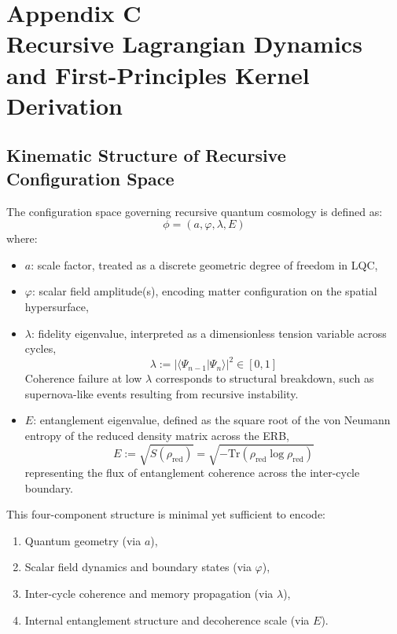 \section*{Appendix C\\Recursive Lagrangian Dynamics and First-Principles Kernel Derivation}
\label{appendix:C}

\subsection*{Kinematic Structure of Recursive Configuration Space}

The configuration space governing recursive quantum cosmology is defined as:
\[
\phi = (a, \varphi, \lambda, E)
\]
where:
\begin{itemize}
  \item \( a \): scale factor, treated as a discrete geometric degree of freedom in LQC,
  \item \( \varphi \): scalar field amplitude(s), encoding matter configuration on the spatial hypersurface,
  \item \( \lambda \): fidelity eigenvalue, interpreted as a dimensionless tension variable across cycles,
  \[
  \lambda := |\langle \Psi_{n-1} | \Psi_n \rangle|^2 \in [0,1]
  \]
  Coherence failure at low \( \lambda \) corresponds to structural breakdown, such as supernova-like events resulting from recursive instability.
  \item \( E \): entanglement eigenvalue, defined as the square root of the von Neumann entropy of the reduced density matrix across the ERB,
  \[
  E := \sqrt{S(\rho_{\text{red}})} = \sqrt{-\mathrm{Tr}(\rho_{\text{red}} \log \rho_{\text{red}})}
  \]
  representing the flux of entanglement coherence across the inter-cycle boundary.
\end{itemize}

This four-component structure is minimal yet sufficient to encode:
\begin{enumerate}
    \item Quantum geometry (via \( a \)),
    \item Scalar field dynamics and boundary states (via \( \varphi \)),
    \item Inter-cycle coherence and memory propagation (via \( \lambda \)),
    \item Internal entanglement structure and decoherence scale (via \( E \)).
\end{enumerate}

